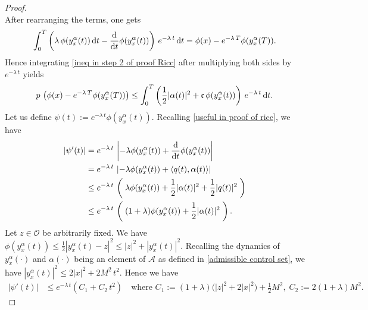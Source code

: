 \documentclass[12pt]{amsart}
\newcommand{\D}[1]{\mbox{\rm #1}}
\newcommand{\dd}{\D{d}}
\numberwithin{equation}{section}
\theoremstyle{plain}
\begin{document}
\begin{proof}
\begin{equation*}
\end{equation*}
After rearranging the terms, one gets
\begin{equation*}
    \int_{0}^{T} \left( \lambda \,\phi(y_{x}^{\alpha}(t))\,\dd t -\frac{\dd}{\dd t}\phi(y_{x}^{\alpha}(t))\right)\,e^{-\lambda \, t}\,\dd t =  \phi(x) - e^{-\lambda\,T}\phi(y_{x}^{\alpha}(T)). 
\end{equation*}
Hence integrating \eqref{ineq in step 2 of proof Ricc} after multiplying both sides by $e^{-\lambda \,t}$ yields
\begin{equation}\label{nice ineq in proof Ricc}
    p\,\left(\phi(x) - e^{-\lambda\,T}\phi(y_{x}^{\alpha}(T))\right) \leq \int_{0}^{T} \left(\frac{1}{2}|\alpha(t)|^{2} + \mathfrak{c}\,\phi(y_{x}^{\alpha}(t))\right)\,e^{-\lambda\,t}\,\dd t.
\end{equation}
Let us define $\psi(t) := e^{-\lambda\,t}\phi(y_{x}^{\alpha}(t))$. Recalling \eqref{useful in proof of ricc}, we have
\begin{equation*}
\begin{aligned}
    |\psi'(t)| 
    & = e^{-\lambda\,t}\,\left| -\lambda \phi(y_{x}^{\alpha}(t))+ \frac{\dd }{\dd t}\phi(y_{x}^{\alpha}(t))\right|\\
    & = e^{-\lambda\,t}\,\left| -\lambda \phi(y_{x}^{\alpha}(t))+ \langle q(t), \alpha(t) \rangle \right|\\
    & \leq e^{-\lambda\,t}\,\left(\;\lambda \phi(y_{x}^{\alpha}(t)) + \frac{1}{2}|\alpha(t)|^{2} + \frac{1}{2} |q(t)|^{2}\;\right)\\
    & \leq e^{-\lambda\,t}\,\left(\;(1+\lambda) \phi(y_{x}^{\alpha}(t)) + \frac{1}{2}|\alpha(t)|^{2} \;\right).
\end{aligned}
\end{equation*}
Let $z\in \mathscr{O}$ be arbitrarily fixed. We have $\phi(y_{x}^{\alpha}(t)) \leq \frac{1}{2}|y_{x}^{\alpha}(t) - z|^{2} \leq |z|^{2} + |y_{x}^{\alpha}(t)|^{2}$. Recalling the dynamics of $y_{x}^{\alpha}(\cdot)$ and $\alpha(\cdot)$ being an element of $\mathcal{A}$ as defined in \eqref{admissible control set}, we have $|y_{x}^{\alpha}(t)|^{2} \leq 2|x|^{2} + 2M^{2}\,t^{2}$. Hence we have
\begin{equation*}
\begin{aligned}
    |\psi'(t)| 
    & \leq e^{-\lambda\,t}\left(C_{1} + C_{2}\,t^{2}\right)\quad \text{where } C_{1}:= (1+\lambda)\big(|z|^{2} + 2|x|^{2}\big)+\frac{1}{2}M^{2},\; C_{2}:=2(1+\lambda)M^{2}.
\end{aligned}
\end{equation*}

\end{proof}
\end{document}
